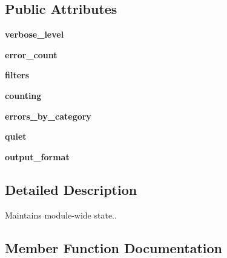 \subsection*{Public Attributes}
\begin{DoxyCompactItemize}
\item 
\mbox{\label{classcpplint_1_1__CppLintState_a94328754c2f7481f4da9757a9dede308}} 
{\bfseries verbose\+\_\+level}
\item 
\mbox{\label{classcpplint_1_1__CppLintState_a4039ff9668057eff4549b99905ce753b}} 
{\bfseries error\+\_\+count}
\item 
\mbox{\label{classcpplint_1_1__CppLintState_a8443105b9623383ab75fa242009c006e}} 
{\bfseries filters}
\item 
\mbox{\label{classcpplint_1_1__CppLintState_acd4f4157637d141a4de63bf10d2ca755}} 
{\bfseries counting}
\item 
\mbox{\label{classcpplint_1_1__CppLintState_afb33527113706b5fcae07d680d8cec99}} 
{\bfseries errors\+\_\+by\+\_\+category}
\item 
\mbox{\label{classcpplint_1_1__CppLintState_a69221fabd3b9b361ef934fee11c0c4c2}} 
{\bfseries quiet}
\item 
\mbox{\label{classcpplint_1_1__CppLintState_a5c68ca79b0ff9b2fba1c488a7b2bd3f0}} 
{\bfseries output\+\_\+format}
\end{DoxyCompactItemize}


\subsection{Detailed Description}
\begin{DoxyVerb}Maintains module-wide state..\end{DoxyVerb}
 

\subsection{Member Function Documentation}
\mbox{\label{classcpplint_1_1__CppLintState_a248c70895572f2468d3c842faff2f285}} 
